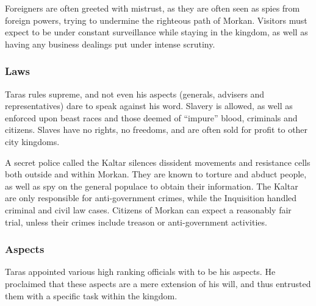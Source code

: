 Foreigners are often greeted with mistrust, as they are often seen as spies
from foreign powers, trying to undermine the righteous path of Morkan.
Visitors must expect to be under constant surveillance while staying in the
kingdom, as well as having any business dealings put under intense scrutiny.

\subsubsection{Laws}

Taras rules supreme, and not even his aspects (generals, advisers and
representatives) dare to speak against his word. Slavery is allowed, as well
as enforced upon beast races and those deemed of ``impure'' blood, criminals
and citizens. Slaves have no rights, no freedoms, and are often sold for
profit to other city kingdoms.

A secret police called the Kaltar silences dissident movements and
resistance cells both outside and within Morkan. They are known to torture and
abduct people, as well as spy on the general populace to obtain their
information. The Kaltar are only responsible for anti-government crimes, while
the Inquisition handled criminal and civil law cases. Citizens of
Morkan can expect a reasonably fair trial, unless their crimes include treason
or anti-government activities.

\subsubsection{Aspects}


Taras appointed various high ranking officials with to be his aspects. He
proclaimed that these aspects are a mere extension of his will, and thus
entrusted them with a specific task within the kingdom.

